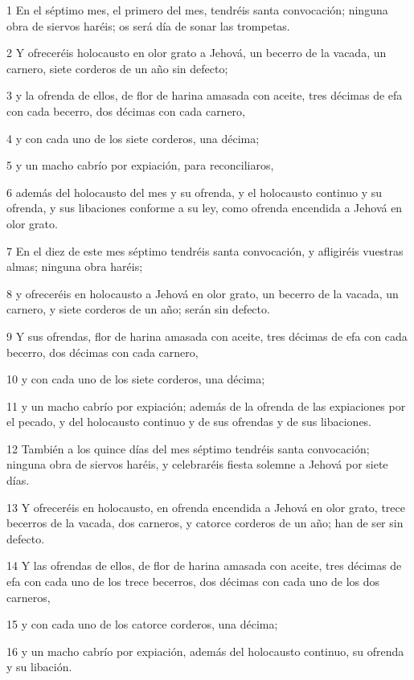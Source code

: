 \par 1 En el séptimo mes, el primero del mes, tendréis santa convocación; ninguna obra de siervos haréis; os será día de sonar las trompetas.
\par 2 Y ofreceréis holocausto en olor grato a Jehová, un becerro de la vacada, un carnero, siete corderos de un año sin defecto;
\par 3 y la ofrenda de ellos, de flor de harina amasada con aceite, tres décimas de efa   con cada becerro, dos décimas con cada carnero,
\par 4 y con cada uno de los siete corderos, una décima;
\par 5 y un macho cabrío por expiación, para reconciliaros,
\par 6 además del holocausto del mes y su ofrenda, y el holocausto continuo y su ofrenda, y sus libaciones conforme a su ley, como ofrenda encendida a Jehová en olor grato.
\par 7 En el diez de este mes séptimo tendréis santa convocación, y afligiréis vuestras almas; ninguna obra haréis;
\par 8 y ofreceréis en holocausto a Jehová en olor grato, un becerro de la vacada, un carnero, y siete corderos de un año; serán sin defecto.
\par 9 Y sus ofrendas, flor de harina amasada con aceite, tres décimas de efa   con cada becerro, dos décimas con cada carnero,
\par 10 y con cada uno de los siete corderos, una décima;
\par 11 y un macho cabrío por expiación; además de la ofrenda de las expiaciones por el pecado, y del holocausto continuo y de sus ofrendas y de sus libaciones.
\par 12 También a los quince días del mes séptimo tendréis santa convocación; ninguna obra de siervos haréis, y celebraréis fiesta solemne a Jehová por siete días. 
\par 13 Y ofreceréis en holocausto, en ofrenda encendida a Jehová en olor grato, trece becerros de la vacada, dos carneros, y catorce corderos de un año; han de ser sin defecto.
\par 14 Y las ofrendas de ellos, de flor de harina amasada con aceite, tres décimas de efa   con cada uno de los trece becerros, dos décimas con cada uno de los dos carneros,
\par 15 y con cada uno de los catorce corderos, una décima;
\par 16 y un macho cabrío por expiación, además del holocausto continuo, su ofrenda y su libación.
